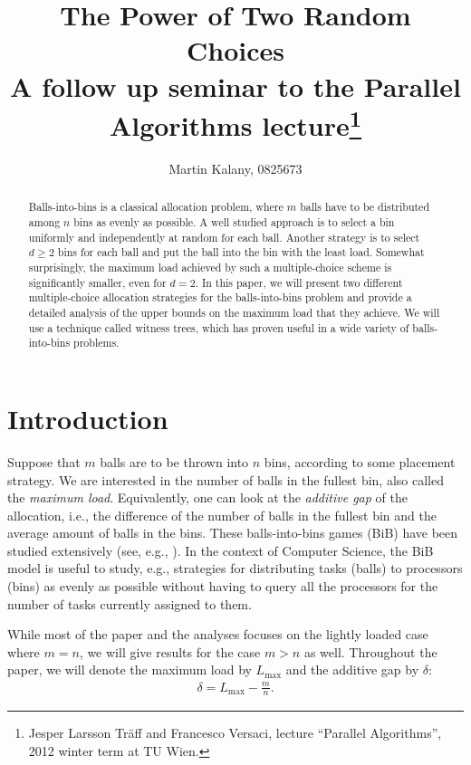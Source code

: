 \documentclass[a4paper,12pt]{article}
\newcommand\load{L_{\mathrm{max}}}
\begin{document}
\title{The Power of Two Random Choices\\ 
\large A follow up seminar to the Parallel Algorithms lecture\footnote{Jesper Larsson Tr\"aff and Francesco Versaci, lecture ``Parallel Algorithms'', 2012 winter term at TU Wien.}}
\author{Martin Kalany, 0825673}

\maketitle
\begin{abstract}
Balls-into-bins is a classical allocation problem, where $m$ balls have to be distributed among $n$ bins as evenly as possible. A well studied approach is to select a bin uniformly and independently at random for each ball. Another strategy is to select $d\geq 2$ bins for each ball and put the ball into the bin with the least load. Somewhat surprisingly, the maximum load achieved by such a multiple-choice scheme is significantly smaller, even for $d=2$. In this paper, we will present two different multiple-choice allocation strategies for the balls-into-bins problem and provide a detailed analysis of the upper bounds on the maximum load that they achieve. We will use a technique called witness trees, which has proven useful in a wide variety of balls-into-bins problems.
\end{abstract}

\section{Introduction}
\label{sec:intro}
Suppose that $m$ balls are to be thrown into $n$ bins, according to some placement strategy. We are interested in the number of balls in the fullest bin, also called the \emph{maximum load}. Equivalently, one can look at the \emph{additive gap} of the allocation, i.e., the difference of the number of balls in the fullest bin and the average amount of balls in the bins. These balls-into-bins games (BiB) have been studied extensively (see, e.g., \cite{JK77}). In the context of Computer Science, the BiB model is useful to study, e.g., strategies for distributing tasks (balls) to processors (bins) as evenly as possible without having to query all the processors for the number of tasks currently assigned to them.

While most of the paper and the analyses focuses on the lightly loaded case where $m=n$, we will give results for the case $m > n$ as well. Throughout the paper, we will denote the maximum load by $\load$ and the additive gap by $\delta$:
\begin{align*}
\delta = \load - \frac{m}{n}.
\end{align*}
\end{document}
